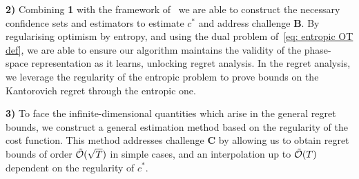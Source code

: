 \textbf{2)} Combining \textbf{1} with the framework of~\cite{abbasi-yadkori_online_2012} we are able to construct the necessary confidence sets and estimators to estimate $c^*$ and address challenge \textbf{B}. By regularising optimism by entropy, and using the dual problem of~\eqref{eq: entropic OT def}, we are able to ensure our algorithm maintains the validity of the phase-space representation as it learns, unlocking regret analysis. In the regret analysis, we leverage the regularity of the entropic problem to prove bounds on the Kantorovich regret through the entropic one.

\textbf{3)} To face the infinite-dimensional quantities which arise in the general regret bounds, we construct a general estimation method based on the regularity of the cost function. This method addresses challenge \textbf{C} by allowing us to obtain regret bounds of order $\tilde{\mathcal{O}}(\sqrt{T})$ in simple cases, and an interpolation up to $\tilde{\mathcal{O}}(T)$ dependent on the regularity of $c^*$. 

